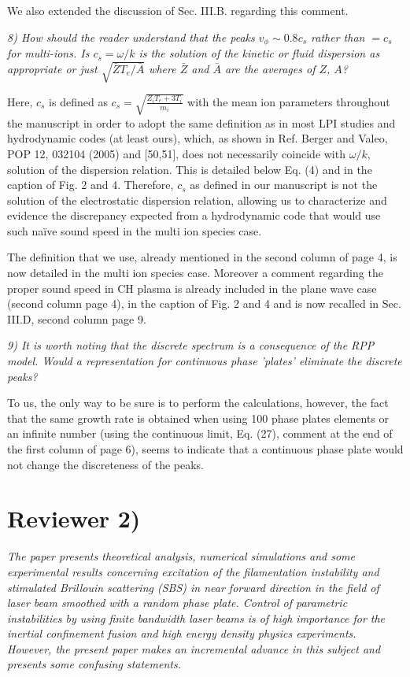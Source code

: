 \documentclass{article}
\begin{document}
We also extended the discussion of Sec. III.B. regarding this comment.

\textit{
8) How should the reader understand that the peaks $ v_\phi \sim 0.8c_s $ rather than $= c_s$ for
multi-ions. Is $c_s =\omega/k$ is the solution of the kinetic or fluid dispersion as appropriate or just $\sqrt{\bar{Z}T_e/\bar{A}}$ where $\bar{Z}$
  and  $\bar{A} $ are the averages of $Z$, $A$?}
  
Here,   $c_s$ is defined as $c_s=\sqrt{\frac{Z_iT_e +3T_i}{m_i}}$ with the mean ion parameters throughout the manuscript in order to adopt the same definition as in most LPI studies and hydrodynamic codes (at least ours), which, as shown in Ref. Berger and Valeo, POP 12, 032104 (2005) and [50,51], does not necessarily coincide with $\omega/k$,  solution of the dispersion relation.
This is detailed below Eq.  (4) and in the caption of Fig. 2 and 4. 
Therefore, $c_s$ as defined in our manuscript is not the solution of the electrostatic dispersion relation, allowing us to characterize and evidence the discrepancy expected from a hydrodynamic code that would use such na\"ive sound speed in the multi ion species case. 

The definition that we use,   already mentioned in the second column of page 4, is now detailed in the multi ion species case. Moreover a comment regarding the proper sound speed in CH plasma is already included  in the plane wave case (second column page 4), in the caption of Fig. 2 and 4 and is now recalled in Sec. III.D, second column page 9.
  
\textit{
9) It is worth noting that the discrete spectrum is a consequence of the RPP model.
Would a representation for continuous phase ’plates’ eliminate the discrete peaks?
}

To us, the only way to be sure is to perform the calculations, however, the fact that the same growth rate is  obtained when using 100 phase plates elements or  an infinite number (using the continuous limit, Eq. (27), comment at the end of the first column of page 6), seems to indicate that a continuous phase plate would not change the discreteness of the peaks. 

\section{Reviewer 2)}
\textit{
The paper presents theoretical analysis, numerical simulations and some experimental results concerning excitation of the filamentation instability and stimulated Brillouin scattering (SBS) in near forward direction in the field of laser beam smoothed with a random phase plate. Control of parametric instabilities by using finite bandwidth laser beams is of high importance for the inertial confinement fusion and high energy density physics experiments. However, the present paper makes an incremental advance in this subject and presents some confusing statements. }
\end{document}

